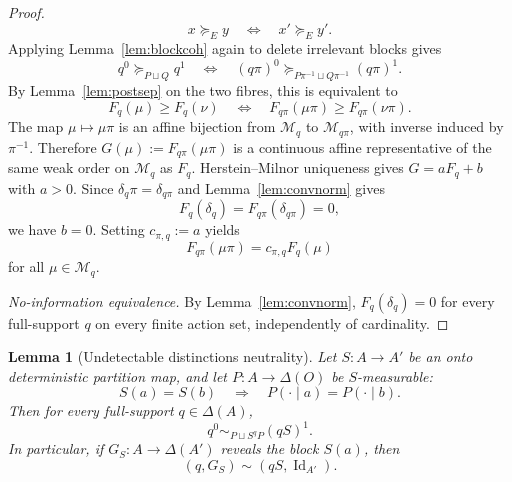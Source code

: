\documentclass[11pt,a4paper]{article}
\newtheorem{lemma}[theorem]{Lemma}
\theoremstyle{definition}
\newcommand{\Id}{\operatorname{Id}}
\newcommand{\1}{\mathbf 1}
\begin{document}
\begin{proof}
\[
x\succeq_E y
\quad\Longleftrightarrow\quad
x'\succeq_E y'.
\]
Applying Lemma~\ref{lem:blockcoh} again to delete irrelevant blocks gives
\[
q^0\succeq_{P\sqcup Q}q^1
\quad\Longleftrightarrow\quad
(q\pi)^0\succeq_{P\pi^{-1}\sqcup Q\pi^{-1}}(q\pi)^1.
\]
By Lemma~\ref{lem:postsep} on the two fibres, this is equivalent to
\[
F_q(\mu)\ge F_q(\nu)
\quad\Longleftrightarrow\quad
F_{q\pi}(\mu\pi)\ge F_{q\pi}(\nu\pi).
\]
The map $\mu\mapsto\mu\pi$ is an affine bijection from $\mathcal M_q$ to $\mathcal M_{q\pi}$, with inverse induced by
$\pi^{-1}$.  Therefore $G(\mu):=F_{q\pi}(\mu\pi)$ is a continuous affine representative of the same weak order on
$\mathcal M_q$ as $F_q$.  Herstein--Milnor uniqueness gives $G=aF_q+b$ with $a>0$.  Since
$\delta_q\pi=\delta_{q\pi}$ and Lemma~\ref{lem:convnorm} gives
\[
F_q(\delta_q)=F_{q\pi}(\delta_{q\pi})=0,
\]
we have $b=0$.  Setting $c_{\pi,q}:=a$ yields
\[
F_{q\pi}(\mu\pi)=c_{\pi,q} F_q(\mu)
\]
for all $\mu\in\mathcal M_q$.

\emph{No-information equivalence.}  By Lemma~\ref{lem:convnorm}, $F_q(\delta_q)=0$ for every full-support $q$ on every
finite action set, independently of cardinality.
\end{proof}

\begin{lemma}[Undetectable distinctions neutrality]\label{lem:neutrality}
Let $S:A\to A'$ be an onto deterministic partition map, and let $P:A\to\Delta(O)$ be $S$-measurable:
\[
S(a)=S(b)\quad\Rightarrow\quad P(\cdot\mid a)=P(\cdot\mid b).
\]
Then for every full-support $q\in\Delta(A)$,
\[
q^0\sim_{P\sqcup S^qP}(qS)^1.
\]
In particular, if $G_S:A\to\Delta(A')$ reveals the block $S(a)$, then
\[
(q,G_S)\sim(qS,\Id_{A'}).
\]
\end{lemma}
\end{document}
